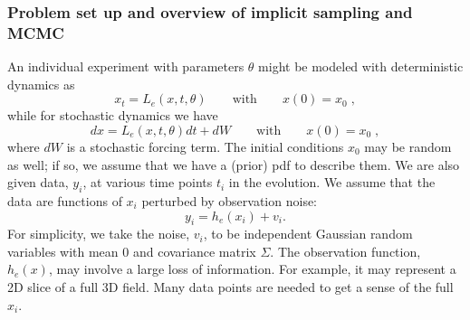 \documentclass[11pt]{article}
\begin{document}
\subsubsection*{Problem set up and overview of implicit sampling and MCMC}
An individual experiment with parameters $\theta$ might be modeled with deterministic dynamics as
\begin{equation}
\label{eq:ModelEquation}
x_t = L_e(x,t,\theta) \qquad \mathrm{with} \qquad x(0) = x_0 \; ,
\end{equation}
while for stochastic dynamics we have
\begin{equation}
\label{eq:ModelEquationSt}
dx = L_e(x,t,\theta) dt + dW \qquad \mathrm{with} \qquad x(0) = x_0 \; ,
\end{equation}
where $dW$ is a stochastic forcing term. 
The initial conditions $x_0$ may be random as well; if so, we assume that we have a (prior) pdf to describe them.
We are also given data, $y_i$, at various time points $t_i$ in the evolution.
We assume that the data are functions of $x_i$ perturbed by observation noise:
\begin{equation}
	\label{eq:DataEquation}
	y_i = h_e(x_i)+v_i.
\end{equation}
For simplicity, we take the noise, $v_i$, to be independent Gaussian random variables with mean 
$0$ and covariance matrix $\Sigma$.
The observation function, $h_e(x)$, may involve a large loss of information.
For example, it may represent a 2D slice of a full 3D field.
Many data points are needed to get a sense of the full $x_i$.
\end{document}
